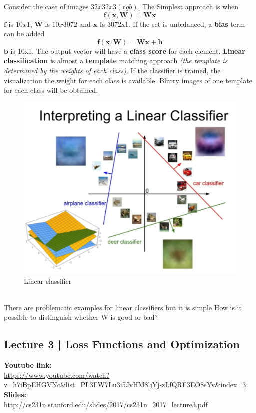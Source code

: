 \documentclass[11pt]{article}
\begin{document}
Consider the case of images $32x32x3 (rgb)$.
The Simplest approach is when
\begin{equation}
 \mathbf{f(x,W) = Wx}   
\end{equation}{}
 $\mathbf{f}$ is $10x1$, $\mathbf{W}$ is $10x3072$ and $\mathbf{x}$ Is 3072x1.
If the set is unbalanced, a\textbf{ bias}  term  can be added 
\begin{equation}
 \mathbf{f(x,W) = Wx + b  } 
\end{equation}{}
$\mathbf{b}$ is 10x1.
The output vector will have a \textbf{class score} for each element.
\textbf{Linear classification} is almost a \textbf{template} matching approach \textit{(the template is determined by the weights of each class)}.
If the classifier is trained, the visualization the weight for each class is available. Blurry images of one template for each class will be obtained.
\begin{figure}[h]
\centering
\captionsetup{justification=centering}
\includegraphics[width=0.75\linewidth]{L12.pdf}
\caption{ Linear classifier}
\label{fig:L12}
\end{figure}\\
There are problematic examples for linear classifiers but it is simple
How is it possible to distinguish whether W is good or bad?








\clearpage
\subsection{Lecture 3 | Loss Functions and Optimization}
\textbf{Youtube link:}\\
\url{https://www.youtube.com/watch?v=h7iBpEHGVNc&list=PL3FW7Lu3i5JvHM8ljYj-zLfQRF3EO8sYv&index=3}\\
\textbf{Slides:}\\
\url{http://cs231n.stanford.edu/slides/2017/cs231n_2017_lecture3.pdf}
\end{document}
